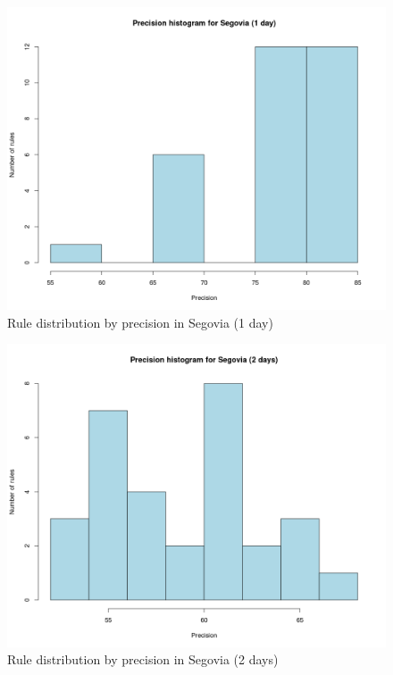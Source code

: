 \begin{figure}[hbtp]
\includegraphics[width=\textwidth]{img/hist_seg1.png}
\caption{Rule distribution by precision in Segovia (1 day)} \label{fig:hist_seg1}
\end{figure}

\begin{figure}[hbtp]
\includegraphics[width=\textwidth]{img/hist_seg2.png}
\caption{Rule distribution by precision in Segovia (2 days)} \label{fig:hist_seg2}
\end{figure}

